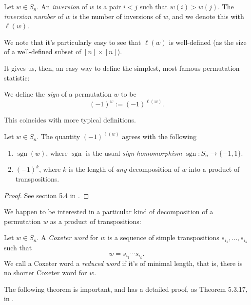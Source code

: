 \documentclass{article}
\DeclareMathOperator{\sgn}{sgn}
\begin{document}
\begin{definition}
    Let $w \in S_n$. 
    An \textit{inversion} of $w$ is a pair $i < j$ such that $w(i) > w(j)$.
    The \textit{inversion number} of $w$ is the number of inversions of $w$, and we denote this with $\ell(w)$.
\end{definition}

We note that it's particularly easy to see that $\ell(w)$ is well-defined (as the size of a well-defined subset of $[n]\times[n]$). 

It gives us, then, an easy way to define the simplest, most famous permutation statistic:

\begin{definition}
    We define the \textit{sign} of a permutation $w$ to be
    \[
        (-1)^w := (-1)^{\ell(w)}.
    \]
\end{definition}

This coincides with more typical definitions.

\begin{remark}
    Let $w \in S_n$.
    The quantity $(-1)^{\ell(w)}$ agrees with the following
    \begin{enumerate}[label=(\alph*)]
        \item $\sgn(w)$, where $\sgn$ is the usual \textit{sign homomorphism} $\sgn: S_n \to \{-1, 1\}$. 
        \item $(-1)^k$, where $k$ is the length of \textit{any} decomposition of $w$ into a product of transpositions.
    \end{enumerate}
\end{remark}

\begin{proof}
    See section 5.4 in \cite{DarijAC}.
\end{proof}

We happen to be interested in a particular kind of decomposition of a permutation $w$ as a product of transpositions:

\begin{definition}
    Let $w \in S_n$. 
    A \textit{Coxeter word} for $w$ is a sequence of simple transpositions $s_{i_1}, \ldots, s_{i_k}$ such that
    \[
        w = s_{i_1}\cdots s_{i_k}.
    \]
    We call a Coxeter word a \textit{reduced word} if it's of minimal length, that is, there is no shorter Coxeter word for $w$.
\end{definition}

The following theorem is important, and has a detailed proof, as Theorem 5.3.17, in \cite{DarijAC}.
\end{document}
